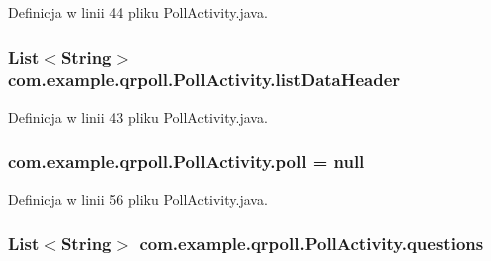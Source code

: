 Definicja w linii 44 pliku Poll\+Activity.\+java.

\hypertarget{classcom_1_1example_1_1qrpoll_1_1_poll_activity_a62dde3c117f038e463aa7174906f5f7b}{
\subsubsection[{list\+Data\+Header}]{\setlength{\rightskip}{0pt plus 5cm}List$<$String$>$ com.\+example.\+qrpoll.\+Poll\+Activity.\+list\+Data\+Header\hspace{0.3cm}{\ttfamily [package]}}}\label{classcom_1_1example_1_1qrpoll_1_1_poll_activity_a62dde3c117f038e463aa7174906f5f7b}


Definicja w linii 43 pliku Poll\+Activity.\+java.

\hypertarget{classcom_1_1example_1_1qrpoll_1_1_poll_activity_accbd807fe57852d64377c5a96401c376}{
\subsubsection[{poll}]{ com.\+example.\+qrpoll.\+Poll\+Activity.\+poll = null\hspace{0.3cm}{\ttfamily [private]}}}\label{classcom_1_1example_1_1qrpoll_1_1_poll_activity_accbd807fe57852d64377c5a96401c376}


Definicja w linii 56 pliku Poll\+Activity.\+java.

\hypertarget{classcom_1_1example_1_1qrpoll_1_1_poll_activity_ae9caea6dcd77802d9edc7f86ace0fc5c}{
\subsubsection[{questions}]{\setlength{\rightskip}{0pt plus 5cm}List$<$String$>$ com.\+example.\+qrpoll.\+Poll\+Activity.\+questions\hspace{0.3cm}{\ttfamily [private]}}}\label{classcom_1_1example_1_1qrpoll_1_1_poll_activity_ae9caea6dcd77802d9edc7f86ace0fc5c}


